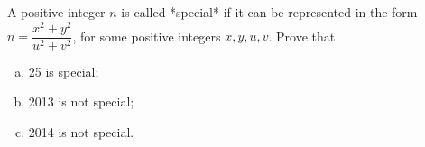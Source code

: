 A positive integer $n$ is called *special* if it can be represented in the form
$n = \dfrac{x^2+y^2}{u^2+v^2}$, for some positive integers $x, y, u, v$. Prove
that

\begin{enumerate}[(a)]
\item 25 is special;
\item 2013 is not special;
\item 2014 is not special.
\end{enumerate}
